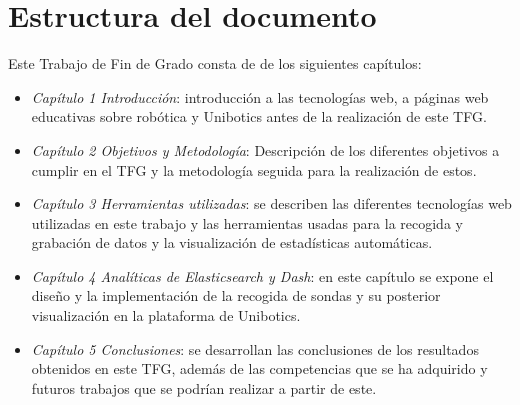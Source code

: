 \newpage
\section{Estructura del documento}

Este Trabajo de Fin de Grado consta de de los siguientes capítulos:

\begin{itemize}
    \item \textit{Capítulo 1 Introducción}: introducción a las tecnologías web, a páginas web educativas sobre robótica y Unibotics antes de la realización de este TFG.
    \item \textit{Capítulo 2 Objetivos y Metodología}: Descripción de los diferentes objetivos a cumplir en el TFG y la metodología seguida para la realización de estos.
    \item \textit{Capítulo 3 Herramientas utilizadas}: se describen las diferentes tecnologías web utilizadas en este trabajo y las herramientas usadas para la recogida y grabación de datos y la visualización de estadísticas automáticas.
   \item \textit{Capítulo 4 Analíticas de Elasticsearch y Dash}: en este capítulo se expone el diseño y la implementación de la recogida de sondas y su posterior visualización en la plataforma de Unibotics.
  \item \textit{Capítulo 5 Conclusiones}: se desarrollan las conclusiones de los resultados obtenidos en este TFG, además de las competencias que se ha adquirido y futuros trabajos que se podrían realizar a partir de este.
   \end{itemize}
